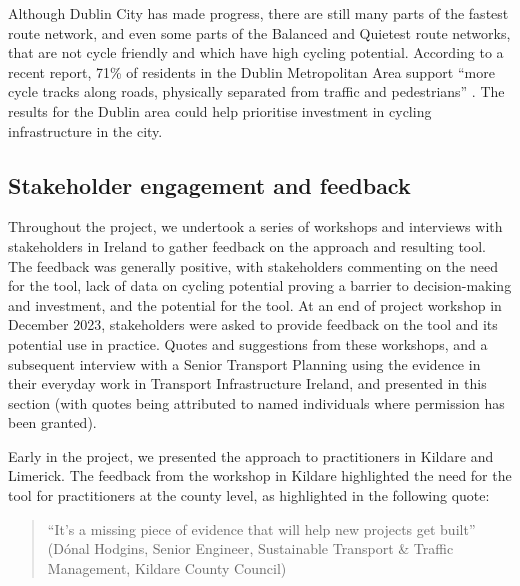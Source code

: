 \documentclass[
  super,
  preprint,
  3p]{elsarticle}
\begin{document}
Although Dublin City has made progress, there are still many parts of
the fastest route network, and even some parts of the Balanced and
Quietest route networks, that are not cycle friendly and which have high
cycling potential. According to a recent report, 71\% of residents in
the Dublin Metropolitan Area support ``more cycle tracks along roads,
physically separated from traffic and pedestrians'' \citep{walking2021}.
The results for the Dublin area could help prioritise investment in
cycling infrastructure in the city.

\subsection{Stakeholder engagement and feedback}\label{sec-qualitative}

Throughout the project, we undertook a series of workshops and
interviews with stakeholders in Ireland to gather feedback on the
approach and resulting tool. The feedback was generally positive, with
stakeholders commenting on the need for the tool, lack of data on
cycling potential proving a barrier to decision-making and investment,
and the potential for the tool. At an end of project workshop in
December 2023, stakeholders were asked to provide feedback on the tool
and its potential use in practice. Quotes and suggestions from these
workshops, and a subsequent interview with a Senior Transport Planning
using the evidence in their everyday work in Transport Infrastructure
Ireland, and presented in this section (with quotes being attributed to
named individuals where permission has been granted).

Early in the project, we presented the approach to practitioners in
Kildare and Limerick. The feedback from the workshop in Kildare
highlighted the need for the tool for practitioners at the county level,
as highlighted in the following quote:

\begin{quote}
``It's a missing piece of evidence that will help new projects get
built'' (Dónal Hodgins, Senior Engineer, Sustainable Transport \&
Traffic Management, Kildare County Council)
\end{quote}
\end{document}
